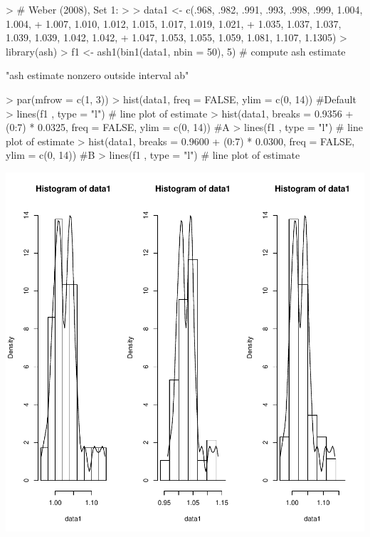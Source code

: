 \documentclass[12pt,letterpaper,final]{article}
\begin{document}
\begin{Schunk}
\begin{Sinput}
> # Weber (2008), Set 1:
> 
> data1 <- c(.968, .982, .991, .993, .998, .999, 1.004, 1.004,
+   1.007, 1.010, 1.012, 1.015, 1.017, 1.019, 1.021,
+   1.035, 1.037, 1.037, 1.039, 1.039, 1.042, 1.042,
+   1.047, 1.053, 1.055, 1.059, 1.081, 1.107, 1.1305)
> library(ash)
> f1 <- ash1(bin1(data1, nbin = 50), 5) # compute ash estimate
\end{Sinput}
\begin{Soutput}
[1] "ash estimate nonzero outside interval ab"
\end{Soutput}
\begin{Sinput}
> par(mfrow = c(1, 3))
> hist(data1, freq = FALSE, ylim = c(0, 14)) #Default
> lines(f1 , type = "l") # line plot of estimate
> hist(data1, breaks = 0.9356 + (0:7) * 0.0325, freq = FALSE, ylim = c(0, 14)) #A
> lines(f1 , type = "l") # line plot of estimate
> hist(data1, breaks = 0.9600 + (0:7) * 0.0300, freq = FALSE, ylim = c(0, 14)) #B
> lines(f1 , type = "l") # line plot of estimate
\end{Sinput}
\end{Schunk}
\includegraphics{lect_main-007}
\end{document}
